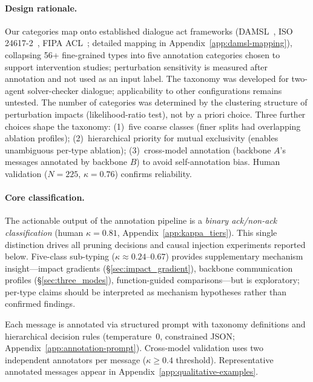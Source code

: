 \paragraph{Design rationale.}
Our categories map onto established dialogue act frameworks (DAMSL~\citep{core_damsl_1997}, ISO 24617-2~\citep{bunt_iso_2012}, FIPA ACL~\citep{fipa_acl_2002}; detailed mapping in Appendix~\ref{app:damsl-mapping}), collapsing 56+ fine-grained types into five annotation categories chosen to support intervention studies; perturbation sensitivity is measured after annotation and not used as an input label. The taxonomy was developed for two-agent solver-checker dialogue; applicability to other configurations remains untested. The number of categories was determined by the clustering structure of perturbation impacts (likelihood-ratio test), not by a priori choice. Three further choices shape the taxonomy: (1)~five coarse classes (finer splits had overlapping ablation profiles); (2)~hierarchical priority for mutual exclusivity (enables unambiguous per-type ablation); (3)~cross-model annotation (backbone $A$'s messages annotated by backbone $B$) to avoid self-annotation bias. Human validation ($N = 225$, $\kappa = 0.76$) confirms reliability.

\paragraph{Core classification.}
The actionable output of the annotation pipeline is a \emph{binary ack/non-ack classification} (human $\kappa = 0.81$, Appendix~\ref{app:kappa_tiers}). This single distinction drives all pruning decisions and causal injection experiments reported below. Five-class sub-typing ($\kappa \approx 0.24$--$0.67$) provides supplementary mechanism insight---impact gradients (\S\ref{sec:impact_gradient}), backbone communication profiles (\S\ref{sec:three_modes}), function-guided comparisons---but is exploratory; per-type claims should be interpreted as mechanism hypotheses rather than confirmed findings.

\label{sec:annotation_protocol}
Each message is annotated via structured prompt with taxonomy definitions and hierarchical decision rules (temperature~0, constrained JSON; Appendix~\ref{app:annotation-prompt}). Cross-model validation uses two independent annotators per message ($\kappa \geq 0.4$ threshold). Representative annotated messages appear in Appendix~\ref{app:qualitative-examples}.
